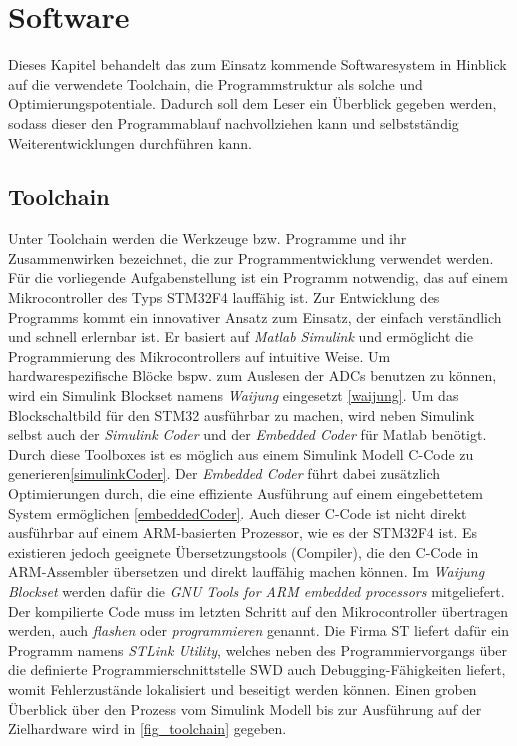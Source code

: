 \chapter{Software}\label{kap6}
Dieses Kapitel behandelt das zum Einsatz kommende Softwaresystem in Hinblick auf die verwendete Toolchain, die Programmstruktur als solche und Optimierungspotentiale. Dadurch soll dem Leser ein Überblick gegeben werden, sodass dieser den Programmablauf nachvollziehen kann und selbstständig Weiterentwicklungen durchführen kann.

\section{Toolchain}
Unter Toolchain werden die Werkzeuge bzw. Programme und ihr Zusammenwirken bezeichnet, die zur Programmentwicklung verwendet werden.\\ Für die vorliegende Aufgabenstellung ist ein Programm notwendig, das auf einem Mikrocontroller des Typs STM32F4 lauffähig ist. Zur Entwicklung des Programms kommt ein innovativer Ansatz zum Einsatz, der einfach verständlich und schnell erlernbar ist. Er basiert auf \textit{Matlab Simulink} und ermöglicht die Programmierung des Mikrocontrollers auf intuitive Weise. Um hardwarespezifische Blöcke bspw. zum Auslesen der ADCs benutzen zu können, wird ein Simulink Blockset namens \textit{Waijung} eingesetzt \autoref{waijung}. Um das Blockschaltbild für den STM32 ausführbar zu machen, wird neben Simulink selbst auch der \textit{Simulink Coder} und der \textit{Embedded Coder} für Matlab benötigt. Durch diese Toolboxes ist es möglich aus einem Simulink Modell  C-Code zu generieren\autoref{simulinkCoder}. Der \textit{Embedded Coder} führt dabei zusätzlich Optimierungen durch, die eine effiziente Ausführung auf einem eingebettetem System ermöglichen \autoref{embeddedCoder}. 
Auch dieser C-Code ist nicht direkt ausführbar auf einem ARM-basierten Prozessor, wie es der STM32F4 ist. Es existieren jedoch geeignete Übersetzungstools (Compiler), die den C-Code in ARM-Assembler übersetzen und direkt lauffähig machen können. Im \textit{Waijung Blockset} werden dafür die \textit{GNU Tools for ARM embedded processors} mitgeliefert. Der kompilierte Code muss im letzten Schritt auf den Mikrocontroller übertragen werden, auch \textit{flashen} oder \textit{programmieren} genannt. Die Firma ST liefert dafür ein Programm namens \textit{STLink Utility}, welches neben des Programmiervorgangs über die definierte Programmierschnittstelle SWD auch Debugging-Fähigkeiten liefert, womit Fehlerzustände lokalisiert und beseitigt werden können. Einen groben Überblick über den Prozess vom Simulink  Modell bis zur Ausführung auf der Zielhardware wird in \autoref{fig_toolchain} gegeben.

